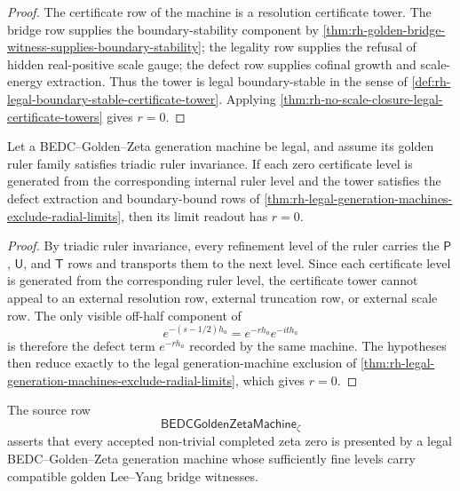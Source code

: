 \begin{proof}
The certificate row of the machine is a resolution certificate tower.
The bridge row supplies the boundary-stability component by
\autoref{thm:rh-golden-bridge-witness-supplies-boundary-stability}; the
legality row supplies the refusal of hidden real-positive scale gauge;
the defect row supplies cofinal growth and scale-energy extraction.
Thus the tower is legal boundary-stable in the sense of
\autoref{def:rh-legal-boundary-stable-certificate-tower}.  Applying
\autoref{thm:rh-no-scale-closure-legal-certificate-towers} gives
$r=0$.
\end{proof}

\begin{theorem}
\label{thm:rh-internal-ruler-invariance-excludes-measurement-exceptions}
Let a BEDC--Golden--Zeta generation machine be legal, and assume its
golden ruler family satisfies triadic ruler invariance.  If each zero
certificate level is generated from the corresponding internal ruler
level and the tower satisfies the defect extraction and boundary-bound
rows of \autoref{thm:rh-legal-generation-machines-exclude-radial-limits},
then its limit readout has $r=0$.
\end{theorem}

\begin{proof}
By triadic ruler invariance, every refinement level of the ruler carries
the $\mathsf P$, $\mathsf U$, and $\mathsf T$ rows and transports them to
the next level.  Since each certificate level is generated from the
corresponding ruler level, the certificate tower cannot appeal to an
external resolution row, external truncation row, or external scale row.
The only visible off-half component of
$$
e^{-(s-1/2)h_a}=e^{-rh_a}e^{-it h_a}
$$
is therefore the defect term $e^{-rh_a}$ recorded by the same machine.
The hypotheses then reduce exactly to the legal generation-machine
exclusion of \autoref{thm:rh-legal-generation-machines-exclude-radial-limits},
which gives $r=0$.
\end{proof}

\begin{definition}
\label{def:rh-bedc-golden-zeta-source-row}
The source row
$$
\mathsf{BEDCGoldenZetaMachine}_{\zeta}
$$
asserts that every accepted non-trivial completed zeta zero is presented
by a legal BEDC--Golden--Zeta generation machine whose sufficiently fine
levels carry compatible golden Lee--Yang bridge witnesses.
\end{definition}

